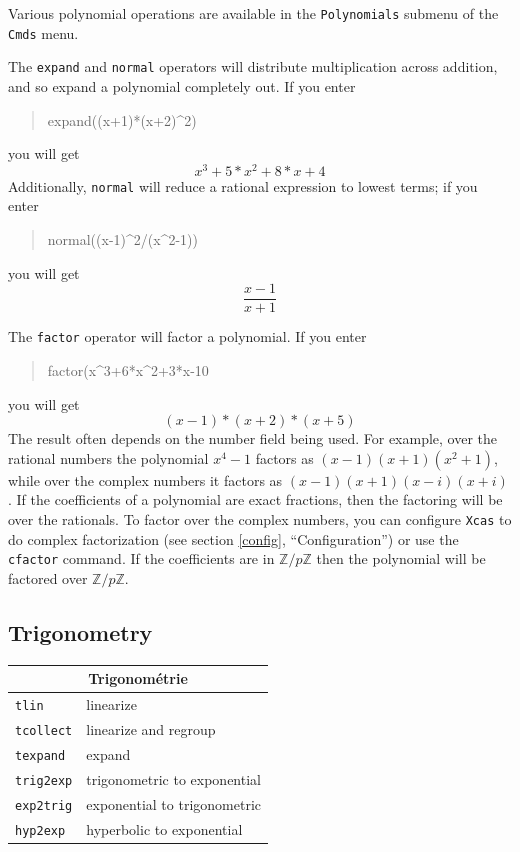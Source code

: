 \documentclass{article}
\newcommand{\Z}{{\mathbb{Z}}}
\newcommand{\xcasin}[1]
{\begin{quote}\ttfamily
#1
\end{quote}}
\newcommand{\xcasout}[1]
{\begin{equation*}
#1
\end{equation*}}
\begin{document}
Various polynomial operations are available in the \texttt{Polynomials}
submenu of the \texttt{Cmds} menu.

The \texttt{expand} and \texttt{normal} operators will distribute
multiplication across addition, and so expand a polynomial completely
out.  If you enter
\xcasin{expand((x+1)*(x+2)\^{}2)}
you will get
\xcasout{x^3+5*x^2+8*x+4}
Additionally, \texttt{normal} will reduce a rational expression to
lowest terms; if you enter
\xcasin{normal((x-1)\^{}2/(x\^{}2-1))}
you will get
\xcasout{\frac{x-1}{x+1}}

The \texttt{factor} operator will factor a polynomial.  
If you enter
\xcasin{factor(x\^{}3+6*x\^{}2+3*x-10}
you will get
\xcasout{(x-1)*(x+2)*(x+5)}
The result often depends on the number field being used.  For example, over the
rational numbers the polynomial $x^4 - 1$ factors as 
$(x-1)(x+1)(x^2 + 1)$, while over the complex numbers it factors as 
$(x-1)(x+1)(x-i)(x+i)$.  If the coefficients of a polynomial are exact
fractions, then the factoring will be over the rationals.  To factor
over the complex numbers, you can configure \texttt{Xcas} to do
complex factorization (see section \ref{config}, ``Configuration'')
or use the \texttt{cfactor} command.
If the coefficients are in $\Z/p\Z$ then the polynomial will be
factored over  $\Z/p\Z$.


\subsection{Trigonometry}

\begin{center}
\begin{tabular}{|p{}|p{}|}
\hline
\multicolumn{2}{|c|}{\bf Trigonom\'etrie}\\
\hline\hline
\texttt{tlin} &linearize\\
\texttt{tcollect} & linearize and regroup\\
\texttt{texpand} & expand\\
\texttt{trig2exp} & trigonometric to exponential\\
\texttt{exp2trig} &exponential to trigonometric\\
\texttt{hyp2exp} &hyperbolic to exponential\\
\hline
\end{tabular}
\end{center}
\end{document}
